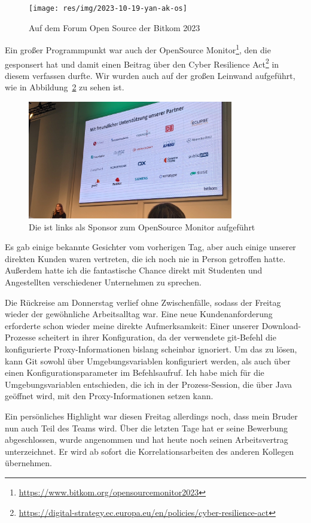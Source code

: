 \begin{figure}[htbp] %
    \centering
    \texttt{[image: res/img/2023-10-19-yan-ak-os]}
    \caption{Auf dem Forum Open Source der Bitkom 2023}
    \label{fig:foss23-yan-initial}
\end{figure}

Ein großer Programmpunkt war auch der {\bitkom} OpenSource Monitor\footnote{\url{https://www.bitkom.org/opensourcemonitor2023}}, den die {\metaeffekt} gesponsert hat und damit einen Beitrag über den Cyber Resilience Act\footnote{\url{https://digital-strategy.ec.europa.eu/en/policies/cyber-resilience-act}} in diesem verfassen durfte.
Wir wurden auch auf der großen Leinwand aufgeführt, wie in Abbildung\ \ref{fig:foss23-sponsor-metaeffekt-initial} zu sehen ist.

\begin{figure}[htbp] %
    \centering
    \includegraphics[width=0.8\textwidth, keepaspectratio]{res/img/2023-10-19-ak-os-metaeffekt-sponsor}
    \caption{Die {\metaeffekt} ist links als Sponsor zum OpenSource Monitor aufgeführt}
    \label{fig:foss23-sponsor-metaeffekt-initial}
\end{figure}

Es gab einige bekannte Gesichter vom vorherigen Tag, aber auch einige unserer direkten Kunden waren vertreten, die ich noch nie in Person getroffen hatte.
Außerdem hatte ich die fantastische Chance direkt mit Studenten und Angestellten verschiedener Unternehmen zu sprechen.

\sweekdaymarginpar{\weekdayThursdayShort, \weekdayFridayShort}

Die Rückreise am Donnerstag verlief ohne Zwischenfälle, sodass der Freitag wieder der gewöhnliche Arbeitsalltag war.
Eine neue Kundenanforderung erforderte schon wieder meine direkte Aufmerksamkeit:
Einer unserer Download-Prozesse scheitert in ihrer Konfiguration, da der verwendete git-Befehl die konfigurierte Proxy-Informationen bislang scheinbar ignoriert.
Um das zu lösen, kann Git sowohl über Umgebungsvariablen konfiguriert werden, als auch über einen Konfigurationsparameter im Befehlsaufruf.
Ich habe mich für die Umgebungsvariablen entschieden, die ich in der Prozess-Session, die über Java geöffnet wird, mit den Proxy-Informationen setzen kann.

Ein persönliches Highlight war diesen Freitag allerdings noch, dass mein Bruder nun auch Teil des Teams wird.
Über die letzten Tage hat er seine Bewerbung abgeschlossen, wurde angenommen und hat heute noch seinen Arbeitsvertrag unterzeichnet.
Er wird ab sofort die Korrelationsarbeiten des anderen Kollegen übernehmen.
